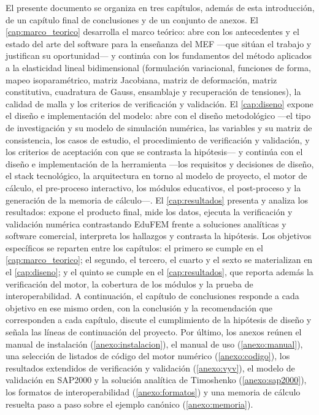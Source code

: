 El presente documento se organiza en tres capítulos, además de esta introducción, de un capítulo final de conclusiones y de un conjunto de anexos. El \autoref{cap:marco_teorico} desarrolla el marco teórico: abre con los antecedentes y el estado del arte del software para la enseñanza del MEF —que sitúan el trabajo y justifican su oportunidad— y continúa con los fundamentos del método aplicados a la elasticidad lineal bidimensional (formulación variacional, funciones de forma, mapeo isoparamétrico, matriz Jacobiana, matriz de deformación, matriz constitutiva, cuadratura de Gauss, ensamblaje y recuperación de tensiones), la calidad de malla y los criterios de verificación y validación. El \autoref{cap:diseno} expone el diseño e implementación del modelo: abre con el diseño metodológico —el tipo de investigación y su modelo de simulación numérica, las variables y su matriz de consistencia, los casos de estudio, el procedimiento de verificación y validación, y los criterios de aceptación con que se contrasta la hipótesis— y continúa con el diseño e implementación de la herramienta —los requisitos y decisiones de diseño, el stack tecnológico, la arquitectura en torno al modelo de proyecto, el motor de cálculo, el pre-proceso interactivo, los módulos educativos, el post-proceso y la generación de la memoria de cálculo—. El \autoref{cap:resultados} presenta y analiza los resultados: expone el producto final, mide los datos, ejecuta la verificación y validación numérica contrastando EduFEM frente a soluciones analíticas y software comercial, interpreta los hallazgos y contrasta la hipótesis. Los objetivos específicos se reparten entre los capítulos: el primero se cumple en el \autoref{cap:marco_teorico}; el segundo, el tercero, el cuarto y el sexto se materializan en el \autoref{cap:diseno}; y el quinto se cumple en el \autoref{cap:resultados}, que reporta además la verificación del motor, la cobertura de los módulos y la prueba de interoperabilidad. A continuación, el capítulo de conclusiones responde a cada objetivo en ese mismo orden, con la conclusión y la recomendación que corresponden a cada capítulo, discute el cumplimiento de la hipótesis de diseño y señala las líneas de continuación del proyecto. Por último, los anexos reúnen el manual de instalación (\autoref{anexo:instalacion}), el manual de uso (\autoref{anexo:manual}), una selección de listados de código del motor numérico (\autoref{anexo:codigo}), los resultados extendidos de verificación y validación (\autoref{anexo:vyv}), el modelo de validación en SAP2000 y la solución analítica de Timoshenko (\autoref{anexo:sap2000}), los formatos de interoperabilidad (\autoref{anexo:formatos}) y una memoria de cálculo resuelta paso a paso sobre el ejemplo canónico (\autoref{anexo:memoria}).